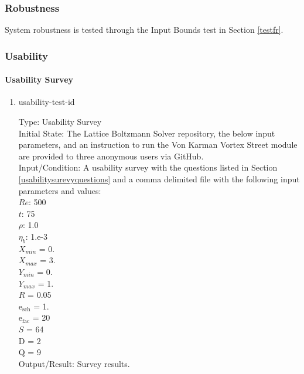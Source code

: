 \documentclass[12pt, titlepage]{article}
\newcommand{\famname}{Lattice Boltzmann Solver}
\newcounter{testcounter} %
\begin{document}
\subsubsection{Robustness}
		
System robustness is tested through the Input Bounds test in Section \ref{testfr}.

\subsubsection{Usability}

\paragraph{Usability Survey}

\begin{enumerate}

\item{usability-test-id\thetestcounter \\}

Type: Usability Survey\\
					
Initial State: The {\famname} repository, the below input parameters, and an
instruction to run the Von Karman Vortex Street module are provided to three
anonymous users via GitHub.\\
					
Input/Condition: A usability survey with the questions listed in Section
\ref{usabilitysurevyquestions} and a comma delimited file with the following
input parameters and values:\\
$Re$: 500\\
$t$: 75\\
$\rho$: 1.0\\
$\eta_b$: 1.e-3\\
$X_{min}$ = 0.\\
$X_{max}$ = 3.\\
$Y_{min}$ = 0.\\
$Y_{max}$ = 1.\\
$R$ = 0.05\\
$\mathrm{e_{sch}}$ = 1.\\
$\mathrm{e_{fac}}$ = 20\\
$S$ = 64\\
$\mathrm{D}$ = 2\\
$\mathrm{Q}$ = 9\\

				
Output/Result: Survey results.\\


\end{enumerate}
\end{document}

